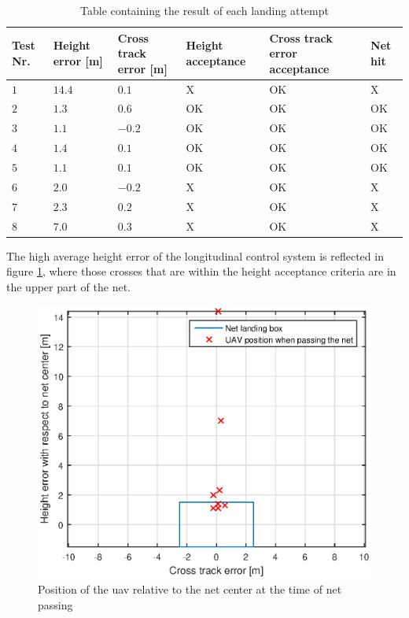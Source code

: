 \begin{table}[H]
\centering
\begin{tabular}{| p{0.5cm} | p{1cm} | p{1cm} | p{3.5cm} | p{3cm} | p{1cm} |}
\hline
\textbf{Test Nr.}	& \textbf{Height error [m]}	& \textbf{Cross track error [m]}& \textbf{Height acceptance}& \textbf{Cross track error acceptance}	& \textbf{Net hit}\\ \hline
$1$				& $14.4$		& $0.1$		& X								& OK									& X					\\ \hline
$2$				& $1.3$		& $0.6$	& OK								& OK										& OK					\\ \hline
$3$				& $1.1$		& $-0.2$	& OK							& OK									& OK				\\ \hline
$4$				& $1.4$		& $0.1$		& OK							& OK										& OK					\\ \hline
$5$				& $1.1$		& $0.1$		& OK							& OK										& OK					\\ \hline
$6$				& $2.0$		& $-0.2$	& X								& OK									& X					\\ \hline
$7$				& $2.3$		& $0.2$		& X								& OK									& X				\\ \hline
$8$				& $7.0$	& $0.3$			& X										& OK										& X					\\ \hline
\end{tabular}
\caption{Table containing the result of each landing attempt}
\label{tb:Day2LandingAttempt}
\end{table}
The high average height error of the longitudinal control system is reflected in figure \ref{Fig:Day2NetPass}, where those crosses that are within the height acceptance criteria are in the upper part of the net.
\begin{figure}[H]
\centering
\includegraphics[scale=0.7]{figs/Experiment/day2NetHit.eps}
\caption{Position of the \gls{uav} relative to the net center at the time of net passing}
\label{Fig:Day2NetPass}
\end{figure}
